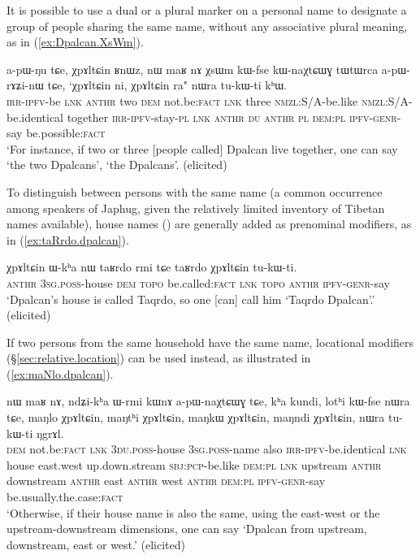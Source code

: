 It is possible to use a dual or a plural marker on a personal name to designate a group of people sharing the same name, without any associative plural meaning, as in (\ref{ex:Dpalcan.XsWm}).

\begin{exe}
\ex \label{ex:Dpalcan.XsWm}
 \gll a-pɯ-ŋu tɕe, χpɤltɕin ʁnɯz, nɯ maʁ nɤ χsɯm kɯ-fse kɯ-naχtɕɯɣ tɯtɯrca a-pɯ-rɤʑi-nɯ tɕe, `χpɤltɕin ni, χpɤltɕin ra" nɯra tu-kɯ-ti kʰɯ. \\
 \textsc{irr}-\textsc{ipfv}-be \textsc{lnk} \textsc{anthr} two \textsc{dem} not.be:\textsc{fact} \textsc{lnk} three \textsc{nmzl}:S/A-be.like \textsc{nmzl}:S/A-be.identical together \textsc{irr}-\textsc{ipfv}-stay-\textsc{pl} \textsc{lnk} \textsc{anthr} \textsc{du} \textsc{anthr} \textsc{pl} \textsc{dem}:\textsc{pl} \textsc{ipfv}-\textsc{genr}-say be.possible:\textsc{fact} \\ 
 \glt `For instance, if two or three [people called] Dpalcan live together, one can say `the two Dpalcans', `the Dpalcans'. (elicited)
\end{exe}

To distinguish between persons with the same name (a common occurrence among speakers of Japhug, given the relatively limited inventory of Tibetan names available), house names () are generally added as prenominal modifiers, as in (\ref{ex:taRrdo.dpalcan}).

\begin{exe}
\ex \label{ex:taRrdo.dpalcan}
\gll χpɤltɕin ɯ-kʰa nɯ taʁrdo rmi tɕe taʁrdo χpɤltɕin tu-kɯ-ti. \\
\textsc{anthr} \textsc{3sg}.\textsc{poss}-house \textsc{dem} \textsc{topo} be.called:\textsc{fact} \textsc{lnk} \textsc{topo} \textsc{anthr} \textsc{ipfv}-\textsc{genr}-say \\
\glt `Dpalcan's house is called Taqrdo, so one [can] call him `Taqrdo Dpalcan'.' (elicited)
\end{exe}

If two persons from the same household have the same name, locational modifiers (§\ref{sec:relative.location}) can be used instead, as illustrated in (\ref{ex:maNlo.dpalcan}).

\begin{exe}
\ex \label{ex:maNlo.dpalcan}
\gll nɯ maʁ nɤ, ndʑi-kʰa ɯ-rmi kɯnɤ a-pɯ-naχtɕɯɣ tɕe, kʰa kundi, lotʰi kɯ-fse nɯra tɕe, 
maŋlo χpɤltɕin, maŋtʰi χpɤltɕin, maŋkɯ χpɤltɕin, maŋndi χpɤltɕin, nɯra tu-kɯ-ti ŋgrɤl. \\
\textsc{dem} not.be:\textsc{fact} \textsc{lnk} \textsc{3du}.\textsc{poss}-house \textsc{3sg}.\textsc{poss}-name also \textsc{irr}-\textsc{ipfv}-be.identical \textsc{lnk} house east.west up.down.stream \textsc{sbj}:\textsc{pcp}-be.like \textsc{dem}:\textsc{pl} \textsc{lnk} upstream \textsc{anthr} downstream \textsc{anthr} east \textsc{anthr} west \textsc{anthr} \textsc{dem}:\textsc{pl} \textsc{ipfv}-\textsc{genr}-say be.usually.the.case:\textsc{fact} \\
\glt `Otherwise, if their house name is also the same, using the east-west or the upstream-downstream dimensions, one can say `Dpalcan from upstream, downstream, east or west.' (elicited)
\end{exe}


